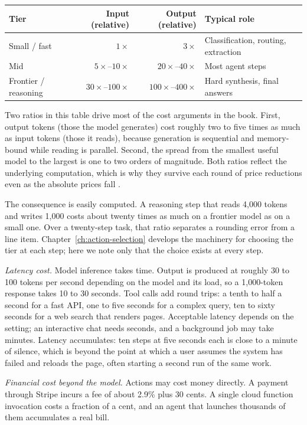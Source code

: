 \documentclass[11pt]{book}
\begin{document}
\begin{center}
\begin{tabular}{lrrl}
\toprule
Tier & Input (relative) & Output (relative) & Typical role \\
\midrule
Small / fast & $1\times$ & $3\times$ & Classification, routing, extraction \\
Mid & $5\times$--$10\times$ & $20\times$--$40\times$ & Most agent steps \\
Frontier / reasoning & $30\times$--$100\times$ & $100\times$--$400\times$ & Hard synthesis, final answers \\
\bottomrule
\end{tabular}
\end{center}

Two ratios in this table drive most of the cost arguments in the book. First, output tokens (those the model generates) cost roughly two to five times as much as input tokens (those it reads), because generation is sequential and memory-bound while reading is parallel. Second, the spread from the smallest useful model to the largest is one to two orders of magnitude. Both ratios reflect the underlying computation, which is why they survive each round of price reductions even as the absolute prices fall \cite{tokeneconomics2026}.

The consequence is easily computed. A reasoning step that reads 4{,}000 tokens and writes 1{,}000 costs about twenty times as much on a frontier model as on a small one. Over a twenty-step task, that ratio separates a rounding error from a line item. Chapter~\ref{ch:action-selection} develops the machinery for choosing the tier at each step; here we note only that the choice exists at every step.

\textit{Latency cost.} Model inference takes time. Output is produced at roughly 30 to 100 tokens per second depending on the model and its load, so a 1{,}000-token response takes 10 to 30 seconds. Tool calls add round trips: a tenth to half a second for a fast API, one to five seconds for a complex query, ten to sixty seconds for a web search that renders pages. Acceptable latency depends on the setting; an interactive chat needs seconds, and a background job may take minutes. Latency accumulates: ten steps at five seconds each is close to a minute of silence, which is beyond the point at which a user assumes the system has failed and reloads the page, often starting a second run of the same work.

\textit{Financial cost beyond the model.} Actions may cost money directly. A payment through Stripe incurs a fee of about 2.9\% plus 30 cents. A single cloud function invocation costs a fraction of a cent, and an agent that launches thousands of them accumulates a real bill.
\end{document}
